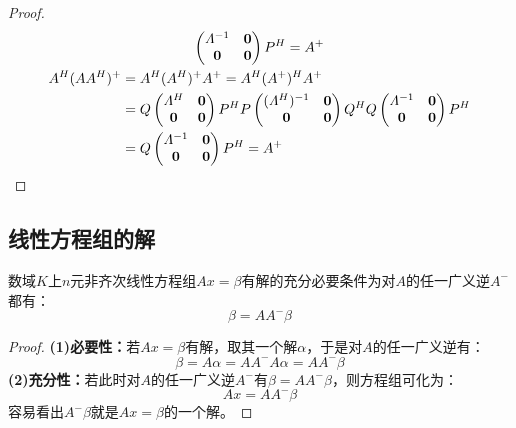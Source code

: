\begin{proof}
\begin{gather*}
\begin{aligned}
\begin{pmatrix}
				\varLambda^{-1} & \mathbf{0} \\
				\mathbf{0} & \mathbf{0}
			\end{pmatrix}
			P^H=A^+
		\end{aligned} \\
		\begin{aligned}
			A^H(AA^H)^+
			&=A^H(A^H)^+A^+
			=A^H(A^+)^HA^+ \\
			&=Q
			\begin{pmatrix}
				\varLambda^H & \mathbf{0} \\
				\mathbf{0} & \mathbf{0}
			\end{pmatrix}
			P^HP
			\begin{pmatrix}
				(\varLambda^H)^{-1} & \mathbf{0} \\
				\mathbf{0} & \mathbf{0}
			\end{pmatrix}
			Q^HQ
			\begin{pmatrix}
				\varLambda^{-1} & \mathbf{0} \\
				\mathbf{0} & \mathbf{0}
			\end{pmatrix}
			P^H \\
			&=Q
			\begin{pmatrix}
				\varLambda^{-1} & \mathbf{0} \\
				\mathbf{0} & \mathbf{0}
			\end{pmatrix}
			P^H=A^+
		\end{aligned}\qedhere
	\end{gather*}
\end{proof}

\subsection{线性方程组的解}
\begin{theorem}\label{theo:ConsistentLinearEqCondition}
	数域$K$上$n$元非齐次线性方程组$Ax=\beta$有解的充分必要条件为对$A$的任一广义逆$A^-$都有：
	\begin{equation*}
		\beta=AA^-\beta
	\end{equation*}
\end{theorem}
\begin{proof}
	\textbf{(1)必要性：}若$Ax=\beta$有解，取其一个解$\alpha$，于是对$A$的任一广义逆有：
	\begin{equation*}
		\beta=A\alpha=AA^-A\alpha=AA^-\beta
	\end{equation*}
	\textbf{(2)充分性：}若此时对$A$的任一广义逆$A^-$有$\beta=AA^-\beta$，则方程组可化为：
	\begin{equation*}
		Ax=AA^-\beta
	\end{equation*}
	容易看出$A^-\beta$就是$Ax=\beta$的一个解。
\end{proof}
